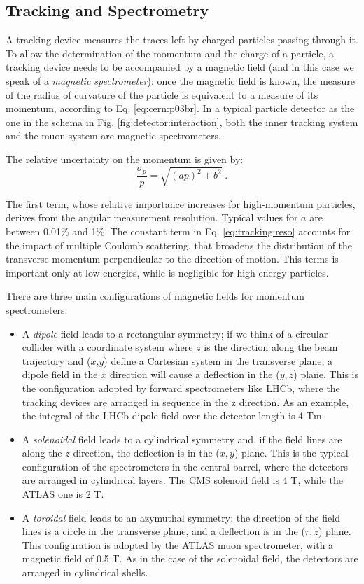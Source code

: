 \subsection{Tracking and Spectrometry}
\label{sec:dec:tracking}
A tracking device measures the traces left by charged particles passing through it. To allow the determination of the momentum and the charge of a particle, a tracking device needs to be accompanied by a magnetic field (and in this case we speak of a \textit{magnetic spectrometer}): once the magnetic field is known, the measure of the radius of curvature of the particle is equivalent to a measure of its momentum, according to Eq. \ref{eq:cern:p03br}. In a typical particle detector as the one in the schema in Fig. \ref{fig:detector:interaction}, both the inner tracking system and the muon system are magnetic spectrometers.

The relative uncertainty on the momentum is given by:
\begin{equation}
\frac{\sigma_p}{p} = \sqrt{ \left(a p \right)^2 + b^2} \; .
\label{eq:tracking:reso}
\end{equation}

The first term, whose relative importance increases for high-momentum particles, derives from the angular measurement resolution. Typical values for $a$ are between 0.01\% and 1\%. The constant term in Eq. \ref{eq:tracking:reso} accounts for the impact of multiple Coulomb scattering, that broadens the distribution of the transverse momentum perpendicular to the direction of motion. This terms is important only at low energies, while is negligible for high-energy particles.

There are three main configurations of magnetic fields for momentum spectrometers:
\begin{itemize}
\item A \textit{dipole} field leads to a rectangular symmetry; if we think of a circular collider with a coordinate system where $z$ is the direction along the beam trajectory and ($x$,$y$) define a Cartesian system in the transverse plane, a dipole  field in the $x$ direction will cause a deflection in the ($y,z$) plane. This is the configuration adopted by forward spectrometers like LHCb, where the tracking devices are arranged in sequence in the z direction. As an example, the integral of the LHCb dipole field over the detector length is 4 Tm.
\item A \textit{solenoidal} field leads to a cylindrical symmetry and, if the field lines are along the $z$ direction, the deflection is in the ($x,y$) plane. This is the typical configuration of the spectrometers in the central barrel, where the detectors are arranged in cylindrical layers. The CMS solenoid field is 4 T, while the ATLAS one is 2 T. 
\item A \textit{toroidal} field leads to an azymuthal symmetry: the direction of the field lines is a circle in the transverse plane, and a deflection is in the ($r,z$) plane. This configuration is adopted by the ATLAS muon spectrometer, with a magnetic field of 0.5 T. As in the case of the solenoidal field, the detectors are arranged in cylindrical shells.
\end{itemize}

